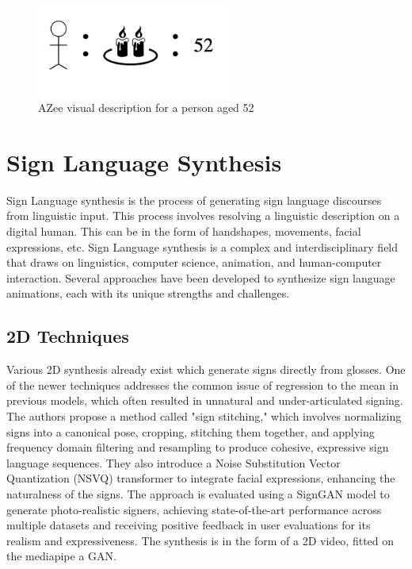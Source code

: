 \documentclass[../../main.tex]{subfiles}
\begin{document}
\begin{figure}
  \centering \includegraphics[width = 2.5in]{chapters/background_work/images/azvd.png}
  \caption{AZee visual description for a person aged 52}
  \label{fig:azvd}
\end{figure}

\section{Sign Language Synthesis}
\label{sec:sign_language_synthesis}

Sign Language synthesis is the process of generating sign language discourses from linguistic input. This process involves resolving a linguistic description on a digital human. This can be in the form of handshapes, movements, facial expressions, etc. Sign Language synthesis is a complex and interdisciplinary field that draws on linguistics, computer science, animation, and human-computer interaction. Several approaches have been developed to synthesize sign language animations, each with its unique strengths and challenges.

\subsection{2D Techniques}
\label{subsec:2d_techniques}

Various 2D synthesis \cite{jiang2024signclipconnectingtextsign} \cite{moryossef2024signmtrealtimemultilingualsign} already exist which generate signs directly from glosses. One of the newer techniques \cite{walsh2024sign} addresses the common issue of regression to the mean in previous models, which often resulted in unnatural and under-articulated signing. The authors propose a method called "sign stitching," which involves normalizing signs into a canonical pose, cropping, stitching them together, and applying frequency domain filtering and resampling to produce cohesive, expressive sign language sequences. They also introduce a Noise Substitution Vector Quantization (NSVQ) transformer to integrate facial expressions, enhancing the naturalness of the signs. The approach is evaluated using a SignGAN model to generate photo-realistic signers, achieving state-of-the-art performance across multiple datasets and receiving positive feedback in user evaluations for its realism and expressiveness. The synthesis is in the form of a 2D video, fitted on the mediapipe a GAN.
\end{document}
